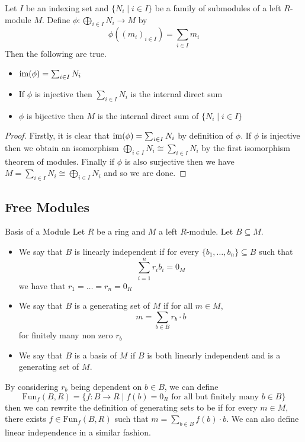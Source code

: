 \documentclass[a4paper]{article}
\begin{document}
\begin{lmm}{}{} Let $I$ be an indexing set and $\{N_i\;|\;i\in I\}$ be a family of submodules of a left $R$-module $M$. Define $\phi:\bigoplus_{i\in I}N_i\to M$ by $$\phi\left((m_i)_{i\in I}\right)=\sum_{i\in I}m_i$$ Then the following are true. 
\begin{itemize}
\item $\operatorname{im}(\phi)=\sum_{i\in I}N_i$
\item If $\phi$ is injective then $\sum_{i\in I}N_i$ is the internal direct sum
\item $\phi$ is bijective then $M$ is the internal direct sum of $\{N_i\;|\;i\in I\}$
\end{itemize} \tcbline
\begin{proof}
Firstly, it is clear that $\operatorname{im}(\phi)=\sum_{i\in I}N_i$ by definition of $\phi$. If $\phi$ is injective then we obtain an isomorphism $\bigoplus_{i\in I}N_i\cong\sum_{i\in I}N_i$ by the first isomorphism theorem of modules. Finally if $\phi$ is also surjective then we have $M=\sum_{i\in I}N_i\cong\bigoplus_{i\in I}N_i$ and so we are done. 
\end{proof}
\end{lmm}

\subsection{Free Modules}
\begin{defn}{Basis of a Module}{} Let $R$ be a ring and $M$ a left $R$-module. Let $B\subseteq M$. 
\begin{itemize}
\item We say that $B$ is linearly independent if for every $\{b_1,\dots,b_n\}\subseteq B$ such that $$\sum_{i=1}^nr_ib_i=0_M$$ we have that $r_1=\dots=r_n=0_R$
\item We say that $B$ is a generating set of $M$ if for all $m\in M$, $$m=\sum_{b\in B}r_b\cdot b$$ for finitely many non zero $r_b$
\item We say that $B$ is a basis of $M$ if $B$ is both linearly independent and is a generating set of $M$. 
\end{itemize}
\end{defn}

By considering $r_b$ being dependent on $b\in B$, we can define $$\text{Fun}_f(B,R)=\{f:B\to R\;|\;f(b)=0_R\text{ for all but finitely many }b\in B\}$$ then we can rewrite the definition of generating sets to be if for every $m\in M$, there exists $f\in\text{Fun}_f(B,R)$ such that $m=\sum_{b\in B}f(b)\cdot b$. We can also define linear independence in a similar fashion. \\~\\
\end{document}
